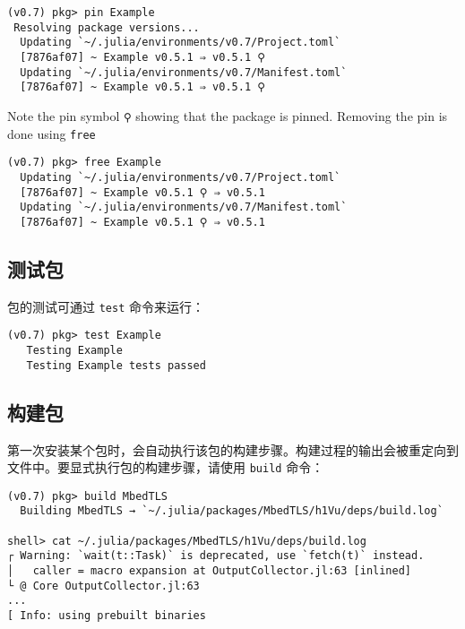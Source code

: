\begin{lstlisting}
(v0.7) pkg> pin Example
 Resolving package versions...
  Updating `~/.julia/environments/v0.7/Project.toml`
  [7876af07] ~ Example v0.5.1 ⇒ v0.5.1 ⚲
  Updating `~/.julia/environments/v0.7/Manifest.toml`
  [7876af07] ~ Example v0.5.1 ⇒ v0.5.1 ⚲
\end{lstlisting}



Note the pin symbol \texttt{⚲} showing that the package is pinned. Removing the pin is done using \texttt{free}




\begin{lstlisting}
(v0.7) pkg> free Example
  Updating `~/.julia/environments/v0.7/Project.toml`
  [7876af07] ~ Example v0.5.1 ⚲ ⇒ v0.5.1
  Updating `~/.julia/environments/v0.7/Manifest.toml`
  [7876af07] ~ Example v0.5.1 ⚲ ⇒ v0.5.1
\end{lstlisting}



\hypertarget{6952888041784542494}{}


\subsection{测试包}



包的测试可通过 \texttt{test} 命令来运行：




\begin{lstlisting}
(v0.7) pkg> test Example
   Testing Example
   Testing Example tests passed
\end{lstlisting}



\hypertarget{1142310729597694114}{}


\subsection{构建包}



第一次安装某个包时，会自动执行该包的构建步骤。构建过程的输出会被重定向到文件中。要显式执行包的构建步骤，请使用 \texttt{build} 命令：




\begin{lstlisting}
(v0.7) pkg> build MbedTLS
  Building MbedTLS → `~/.julia/packages/MbedTLS/h1Vu/deps/build.log`

shell> cat ~/.julia/packages/MbedTLS/h1Vu/deps/build.log
┌ Warning: `wait(t::Task)` is deprecated, use `fetch(t)` instead.
│   caller = macro expansion at OutputCollector.jl:63 [inlined]
└ @ Core OutputCollector.jl:63
...
[ Info: using prebuilt binaries
\end{lstlisting}



